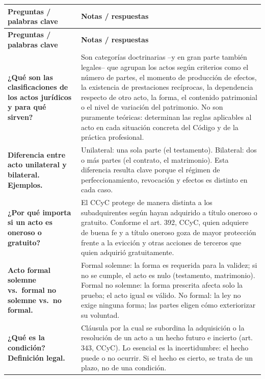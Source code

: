 \documentclass[12pt,oneside]{book}
\begin{document}
\begin{longtable}{
    >{\raggedright\arraybackslash}p{}
    >{\raggedright\arraybackslash}p{}
}
\toprule
\textbf{Preguntas / palabras clave} & \textbf{Notas / respuestas} \\
\midrule
\endfirsthead
\toprule
\textbf{Preguntas / palabras clave} & \textbf{Notas / respuestas} \\
\midrule
\endhead

\textbf{¿Qué son las clasificaciones de los actos jurídicos y para qué sirven?} &
Son categorías doctrinarias --y en gran parte también legales-- que agrupan los actos según criterios como el número de partes, el momento de producción de efectos, la existencia de prestaciones recíprocas, la dependencia respecto de otro acto, la forma, el contenido patrimonial o el nivel de variación del patrimonio. No son puramente teóricas: determinan las reglas aplicables al acto en cada situación concreta del Código y de la práctica profesional. \\

\textbf{Diferencia entre acto unilateral y bilateral. Ejemplos.} &
Unilateral: una sola parte (el testamento). Bilateral: dos o más partes (el contrato, el matrimonio). Esta diferencia resulta clave porque el régimen de perfeccionamiento, revocación y efectos es distinto en cada caso. \\

\textbf{¿Por qué importa si un acto es oneroso o gratuito?} &
El CCyC protege de manera distinta a los subadquirentes según hayan adquirido a título oneroso o gratuito. Conforme el art. 392, CCyC, quien adquiere de buena fe y a título oneroso goza de mayor protección frente a la evicción y otras acciones de terceros que quien adquirió gratuitamente. \\

\textbf{Acto formal solemne vs.\ formal no solemne vs.\ no formal.} &
Formal solemne: la forma es requerida para la validez; si no se cumple, el acto es nulo (testamento, matrimonio). Formal no solemne: la forma prescrita afecta solo la prueba; el acto igual es válido. No formal: la ley no exige ninguna forma; las partes eligen cómo exteriorizar su voluntad. \\

\textbf{¿Qué es la condición? Definición legal.} &
Cláusula por la cual se subordina la adquisición o la resolución de un acto a un hecho futuro e incierto (art. 343, CCyC). Lo esencial es la incertidumbre: el hecho puede o no ocurrir. Si el hecho es cierto, se trata de un plazo, no de una condición. \\


\end{longtable}
\end{document}
